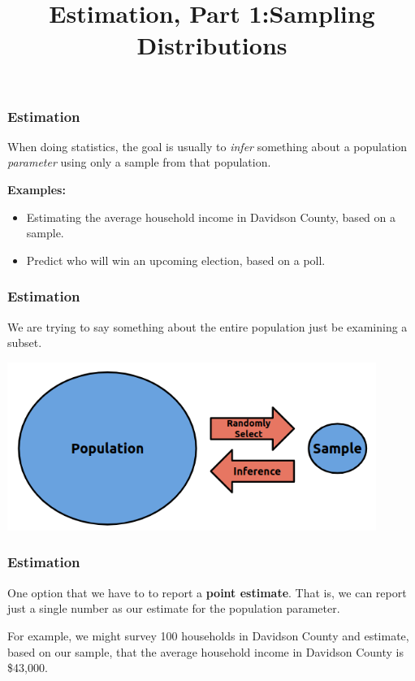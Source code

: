 \documentclass[11pt, table]{beamer}
\newcommand{\p}{\pause}
\begin{document}
	\title{Estimation, Part 1:\newline Sampling Distributions}
	\date{}
	\begin{frame}[plain]
	\maketitle
\end{frame}

\begin{frame}
\frametitle{Estimation}

When doing statistics, the goal is usually to \emph{infer} something about a population \emph{parameter} using only a sample from that population.
\vspace{0.25in}\p

\textbf{Examples:}
\begin{itemize}
	\item Estimating the average household income in Davidson County, based on a sample.\p
	\item Predict who will win an upcoming election, based on a poll.
\end{itemize}
\end{frame}

\begin{frame}[t]
\frametitle{Estimation}
	We are trying to say something about the entire population just be examining a subset.
\vspace{0.25in}

	\begin{center}
	\includegraphics[width = 0.9\textwidth]{images/pop_sample.png}
	\end{center}
\end{frame}

\begin{frame}
\frametitle{Estimation}
One option that we have to to report a \textbf{point estimate}. That is, we can report just a single number as our estimate for the population parameter.

\vspace{0.25in}
For example, we might survey 100 households in Davidson County and estimate, based on our sample, that the average household income in Davidson County is \$43,000.
\end{frame}
\end{document}
